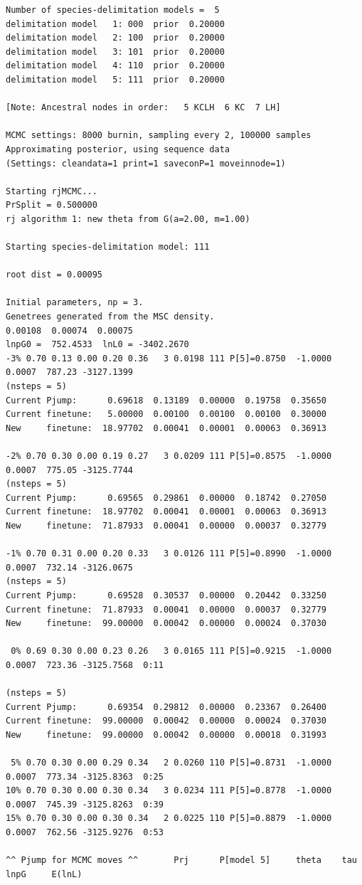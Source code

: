 \documentclass[a4paper]{book}
\numberwithin{equation}{section} \renewcommand{\baselinestretch}{0.55}
\begin{document}
\begin{adjustwidth}{-100pt}{100pt}
{\small
\begin{verbatim}
Number of species-delimitation models =  5
delimitation model   1: 000  prior  0.20000
delimitation model   2: 100  prior  0.20000
delimitation model   3: 101  prior  0.20000
delimitation model   4: 110  prior  0.20000
delimitation model   5: 111  prior  0.20000

[Note: Ancestral nodes in order:   5 KCLH  6 KC  7 LH]

MCMC settings: 8000 burnin, sampling every 2, 100000 samples
Approximating posterior, using sequence data
(Settings: cleandata=1 print=1 saveconP=1 moveinnode=1)

Starting rjMCMC...
PrSplit = 0.500000
rj algorithm 1: new theta from G(a=2.00, m=1.00)

Starting species-delimitation model: 111

root dist = 0.00095

Initial parameters, np = 3.
Genetrees generated from the MSC density.
0.00108  0.00074  0.00075
lnpG0 =  752.4533  lnL0 = -3402.2670
-3% 0.70 0.13 0.00 0.20 0.36   3 0.0198 111 P[5]=0.8750  -1.0000 0.0007  787.23 -3127.1399
(nsteps = 5)
Current Pjump:      0.69618  0.13189  0.00000  0.19758  0.35650
Current finetune:   5.00000  0.00100  0.00100  0.00100  0.30000
New     finetune:  18.97702  0.00041  0.00001  0.00063  0.36913

-2% 0.70 0.30 0.00 0.19 0.27   3 0.0209 111 P[5]=0.8575  -1.0000 0.0007  775.05 -3125.7744
(nsteps = 5)
Current Pjump:      0.69565  0.29861  0.00000  0.18742  0.27050
Current finetune:  18.97702  0.00041  0.00001  0.00063  0.36913
New     finetune:  71.87933  0.00041  0.00000  0.00037  0.32779

-1% 0.70 0.31 0.00 0.20 0.33   3 0.0126 111 P[5]=0.8990  -1.0000 0.0007  732.14 -3126.0675
(nsteps = 5)
Current Pjump:      0.69528  0.30537  0.00000  0.20442  0.33250
Current finetune:  71.87933  0.00041  0.00000  0.00037  0.32779
New     finetune:  99.00000  0.00042  0.00000  0.00024  0.37030

 0% 0.69 0.30 0.00 0.23 0.26   3 0.0165 111 P[5]=0.9215  -1.0000 0.0007  723.36 -3125.7568  0:11

(nsteps = 5)
Current Pjump:      0.69354  0.29812  0.00000  0.23367  0.26400
Current finetune:  99.00000  0.00042  0.00000  0.00024  0.37030
New     finetune:  99.00000  0.00042  0.00000  0.00018  0.31993

 5% 0.70 0.30 0.00 0.29 0.34   2 0.0260 110 P[5]=0.8731  -1.0000 0.0007  773.34 -3125.8363  0:25
10% 0.70 0.30 0.00 0.30 0.34   3 0.0234 111 P[5]=0.8778  -1.0000 0.0007  745.39 -3125.8263  0:39
15% 0.70 0.30 0.00 0.30 0.34   2 0.0225 110 P[5]=0.8879  -1.0000 0.0007  762.56 -3125.9276  0:53

^^ Pjump for MCMC moves ^^       Prj      P[model 5]     theta    tau   lnpG     E(lnL)
\end{verbatim}
}
\end{adjustwidth}
\end{document}
